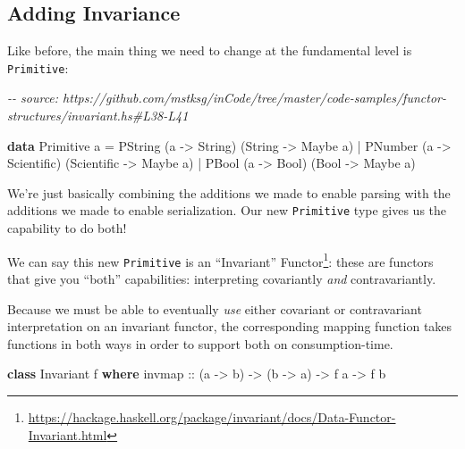 \documentclass[]{article}
\newenvironment{Shaded}{}{}
\newcommand{\CommentTok}[1]{\textcolor[rgb]{0.38,0.63,0.69}{\textit{#1}}}
\newcommand{\DataTypeTok}[1]{\textcolor[rgb]{0.56,0.13,0.00}{#1}}
\newcommand{\KeywordTok}[1]{\textcolor[rgb]{0.00,0.44,0.13}{\textbf{#1}}}
\newcommand{\NormalTok}[1]{#1}
\newcommand{\OperatorTok}[1]{\textcolor[rgb]{0.40,0.40,0.40}{#1}}
\newcommand{\OtherTok}[1]{\textcolor[rgb]{0.00,0.44,0.13}{#1}}
\renewcommand{\href}[2]{#2\footnote{\url{#1}}}
\begin{document}
\hypertarget{adding-invariance}{%
\subsection{Adding Invariance}\label{adding-invariance}}

Like before, the main thing we need to change at the fundamental level is
\texttt{Primitive}:

\begin{Shaded}
\begin{Highlighting}[]
\CommentTok{{-}{-} source: https://github.com/mstksg/inCode/tree/master/code{-}samples/functor{-}structures/invariant.hs\#L38{-}L41}

\KeywordTok{data} \DataTypeTok{Primitive}\NormalTok{ a }\OtherTok{=}
      \DataTypeTok{PString}\NormalTok{ (a }\OtherTok{{-}>} \DataTypeTok{String}\NormalTok{)     (}\DataTypeTok{String}     \OtherTok{{-}>} \DataTypeTok{Maybe}\NormalTok{ a)}
    \OperatorTok{|} \DataTypeTok{PNumber}\NormalTok{ (a }\OtherTok{{-}>} \DataTypeTok{Scientific}\NormalTok{) (}\DataTypeTok{Scientific} \OtherTok{{-}>} \DataTypeTok{Maybe}\NormalTok{ a)}
    \OperatorTok{|} \DataTypeTok{PBool}\NormalTok{   (a }\OtherTok{{-}>} \DataTypeTok{Bool}\NormalTok{)       (}\DataTypeTok{Bool}       \OtherTok{{-}>} \DataTypeTok{Maybe}\NormalTok{ a)}
\end{Highlighting}
\end{Shaded}

We're just basically combining the additions we made to enable parsing with the
additions we made to enable serialization. Our new \texttt{Primitive} type gives
us the capability to do both!

We can say this new \texttt{Primitive} is an
\href{https://hackage.haskell.org/package/invariant/docs/Data-Functor-Invariant.html}{``Invariant''
Functor}: these are functors that give you ``both'' capabilities: interpreting
covariantly \emph{and} contravariantly.

Because we must be able to eventually \emph{use} either covariant or
contravariant interpretation on an invariant functor, the corresponding mapping
function takes functions in both ways in order to support both on
consumption-time.

\begin{Shaded}
\begin{Highlighting}[]
\KeywordTok{class} \DataTypeTok{Invariant}\NormalTok{ f }\KeywordTok{where}
\OtherTok{    invmap ::}\NormalTok{ (a }\OtherTok{{-}>}\NormalTok{ b) }\OtherTok{{-}>}\NormalTok{ (b }\OtherTok{{-}>}\NormalTok{ a) }\OtherTok{{-}>}\NormalTok{ f a }\OtherTok{{-}>}\NormalTok{ f b}
\end{Highlighting}
\end{Shaded}
\end{document}
